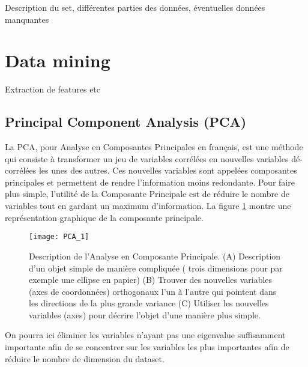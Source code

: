Description du set, différentes parties des données, éventuelles données manquantes


\section{Data mining}
Extraction de features etc 
\subsection{Principal Component Analysis (PCA)}\label{PCAss}
La PCA, pour Analyse en Composantes Principales en français, est une méthode qui consiste à transformer un jeu de variables corrélées en nouvelles variables dé-corrélées les unes des autres. Ces nouvelles variables sont appelées composantes principales et permettent de rendre l'information moins redondante. Pour faire plus simple, l'utilité de la Composante Principale est de réduire le nombre de variables tout en gardant un maximum d'information. La figure \ref{PCAdefinition} montre une représentation graphique de la composante principale. 


\begin{figure}[H]
	\caption{\label{PCAdefinition} Description de l'Analyse en Composante Principale. (A) Description d'un objet simple de manière compliquée ( trois dimensions pour par exemple une ellipse en papier) (B) Trouver des nouvelles variables (axes de coordonnées) orthogonaux l'un à l'autre qui pointent dans les directions de la plus grande variance (C) Utiliser les nouvelles variables (axes) pour décrire l'objet d'une manière plus simple. }
	\texttt{[image: PCA\_1]}
\end{figure}

On pourra ici éliminer les variables n'ayant pas une eigenvalue suffisamment importante afin de se concentrer sur les variables les plus importantes afin de réduire le nombre de dimension du dataset. 





